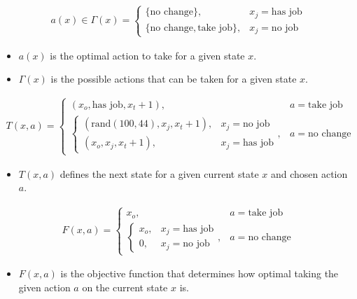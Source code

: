 \documentclass[a4paper, 12pt]{article}
\begin{document}
\[
\begin{aligned}
  a(x) \in \Gamma(x) = \begin{cases}
    \{\text{no change}\}, & x_{j} = \text{has job} \\
    \{\text{no change}, \text{take job}\}, & x_{j} = \text{no job}
  \end{cases}
\end{aligned}
\]

\begin{itemize}
  \item $a(x)$ is the optimal action to take for a given state $x$.
  \item $\Gamma(x)$ is the possible actions that can be taken for a given state $x$.
\end{itemize}

\[
\begin{aligned}
  T(x, a) = \begin{cases}
    (x_{o}, \text{has job}, x_{t} + 1), & a = \text{take job} \\
    \begin{cases}
      (\text{rand}(100, 44), x_{j}, x_{t}+1), & x_{j} = \text{no job} \\
      (x_{o}, x_{j}, x_{t}+1), & x_{j} = \text{has job}
    \end{cases}, & a = \text{no change}
  \end{cases}
\end{aligned}
\]

\begin{itemize}
  \item $T(x, a)$ defines the next state for a given current state $x$ and chosen action $a$.
\end{itemize}

\[
\begin{aligned}
  F(x, a) = \begin{cases}
    x_{o}, & a=\text{take job} \\
    \begin{cases}
      x_{o}, & x_{j}=\text{has job} \\
      0, & x_{j} = \text{no job}
    \end{cases}, & a=\text{no change}
  \end{cases}
\end{aligned}
\]

\begin{itemize}
  \item $F(x,a)$ is the objective function that determines how optimal taking the given action $a$ on the current state $x$ is.
\end{itemize}
\end{document}
